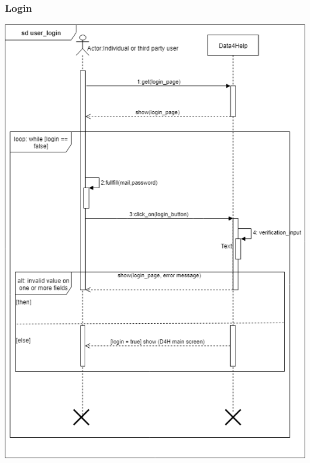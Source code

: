 \subsubsection{Login}
\includegraphics[scale = 0.5]{sections/requirements/sequenceDiagrams/login.png}
\clearpage
